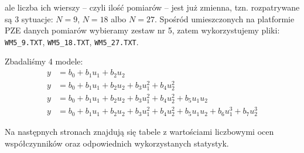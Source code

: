 \documentclass[11pt, a4paper]{article}
\begin{document}
ale liczba ich wierszy -- czyli ilość pomiarów -- jest już zmienna, tzn. rozpatrywane są 3 sytuacje:
$N = 9$, $N = 18$ albo $N = 27$. Spośród umieszczonych na platformie PZE danych pomiarów wybieramy zestaw nr 5, zatem wykorzystujemy pliki:
\texttt{WM5\_9.TXT}, \texttt{WM5\_18.TXT}, \texttt{WM5\_27.TXT}.

Zbadaliśmy 4 modele:
\begin{align}
	y &= b_0 + b_1 u_1 + b_2 u_2 \tag{model 1} \\
	y &= b_0 + b_1 u_1 + b_2 u_2 +
		b_3 u_1^2 + b_4 u_2^2 \tag{model 2} \\
	y &= b_0 + b_1 u_1 + b_2 u_2 +
		b_3 u_1^2 + b_4 u_2^2 + b_5 u_1 u_2 \tag{model 3} \\
	y &= b_0 + b_1 u_1 + b_2 u_2 +
		b_3 u_1^2 + b_4 u_2^2 + b_5 u_1 u_2 + b_6 u_1^3 + b_7 u_2^3 \tag{model 4}
\end{align}

Na następnych stronach znajdują się tabele z wartościami liczbowymi ocen współczynników oraz odpowiednich wykorzystanych statystyk.

\renewcommand{\arraystretch}{1.1}

\newcolumntype{b}{X}

\setlength\arrayrulewidth{1pt}
\end{document}
